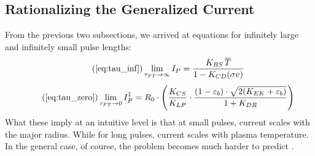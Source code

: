 \subsection{Rationalizing the Generalized Current}

From the previous two subsections, we arrived at equations for infinitely large and infinitely small pulse lengths:
\begin{equation}
	\tag{\ref{eq:tau_inf}}
	\lim_{\tau_{FT} \to \infty} I_P = \frac{ K_{BS} \, \overline T }{ 1 - K_{CD} ( \sigma v ) }
\end{equation}
\begin{equation}
	\tag{\ref{eq:tau_zero}}
	\lim_{ \tau_{FT} \to 0 } I_P^\ddagger = R_0 \cdot \left( \frac{ K_{CS} }{ K_{LP} } \cdot \frac{ ( 1 - \varepsilon_b ) \cdot \sqrt{ 2 ( K_{EK} + \varepsilon_b ) } }{ 1 + K_{DR} } \right)
\end{equation}
What these imply at an intuitive level is that at small pulses, current scales with the major radius. While for long pulses, current scales with plasma temperature. In the general case, of course, the problem becomes much harder to predict .

%

